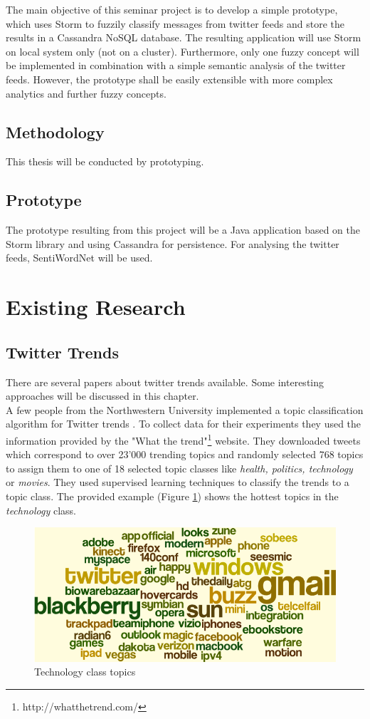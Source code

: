 \documentclass[a4paper]{article}
\begin{document}
The main objective of this seminar project is to develop a simple prototype, which uses Storm to fuzzily classify messages from twitter feeds and store the results in a Cassandra NoSQL database.
The resulting application will use Storm on local system only (not on a cluster). Furthermore, only one fuzzy concept will be implemented in combination with a simple semantic analysis of the twitter feeds. However, the prototype shall be easily extensible with more complex analytics and further fuzzy concepts.


\subsection{Methodology}
This thesis will be conducted by prototyping. 
\subsection{Prototype}
The prototype resulting from this project will be a Java application based on the Storm library and using Cassandra for persistence. For analysing the twitter feeds, SentiWordNet will be used. 

\section{Existing Research}
\subsection{Twitter Trends}\label{twitter_trends}
There are several papers about twitter trends available. Some interesting approaches will be discussed in this chapter.\\

A few people from the Northwestern University implemented a topic classification algorithm for Twitter trends \cite{leeEtAl2011}. To collect data for their experiments they used the information provided by the "What the trend"\footnote{http://whatthetrend.com/} website. They downloaded tweets which correspond to over 23'000 trending topics and randomly selected 768 topics to assign them to one of 18 selected topic classes like \textit{health, politics, technology} or \textit{movies}. They used supervised learning techniques to classify the trends to a topic class. The provided example (Figure \ref{techClass}) shows the hottest topics in the \textit{technology} class.
\begin{figure}[h!]
	\centering
	\includegraphics[scale=0.35]{images/technologyClass.png}
	\caption{Technology class topics}
	\label{techClass}
\end{figure}
\end{document}
